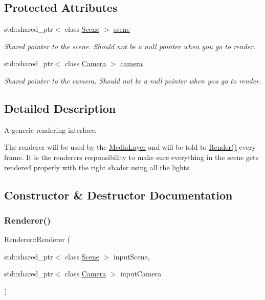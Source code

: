\subsection*{Protected Attributes}
\begin{DoxyCompactItemize}
\item 
std\+::shared\+\_\+ptr$<$ class \hyperlink{class_scene}{Scene} $>$ \hyperlink{class_renderer_a65178695d48824d3afd6fe40fd4915b6}{scene}
\begin{DoxyCompactList}\small\item\em Shared pointer to the scene. Should not be a null pointer when you go to render. \end{DoxyCompactList}\item 
std\+::shared\+\_\+ptr$<$ class \hyperlink{class_camera}{Camera} $>$ \hyperlink{class_renderer_a7a08c6489c1ffe8e346b9f205b4014ca}{camera}
\begin{DoxyCompactList}\small\item\em Shared pointer to the camera. Should not be a null pointer when you go to render. \end{DoxyCompactList}\end{DoxyCompactItemize}


\subsection{Detailed Description}
A generic rendering interface. 

The renderer will be used by the \hyperlink{class_media_layer}{Media\+Layer} and will be told to \hyperlink{class_renderer_a38623da22aa718cfa41e2514ebd269f5}{Render()} every frame. It is the renderer\textquotesingle{}s responsibility to make sure everything in the scene gets rendered properly with the right shader using all the lights. 

\subsection{Constructor \& Destructor Documentation}
\hypertarget{class_renderer_adc8ce31cd649bdf220ca8355809b1d06}{}\label{class_renderer_adc8ce31cd649bdf220ca8355809b1d06} 
\subsubsection{\texorpdfstring{Renderer()}{Renderer()}}
{\footnotesize\ttfamily Renderer\+::\+Renderer (\begin{DoxyParamCaption}\item[{std\+::shared\+\_\+ptr$<$ class \hyperlink{class_scene}{Scene} $>$}]{input\+Scene,  }\item[{std\+::shared\+\_\+ptr$<$ class \hyperlink{class_camera}{Camera} $>$}]{input\+Camera }\end{DoxyParamCaption})}



